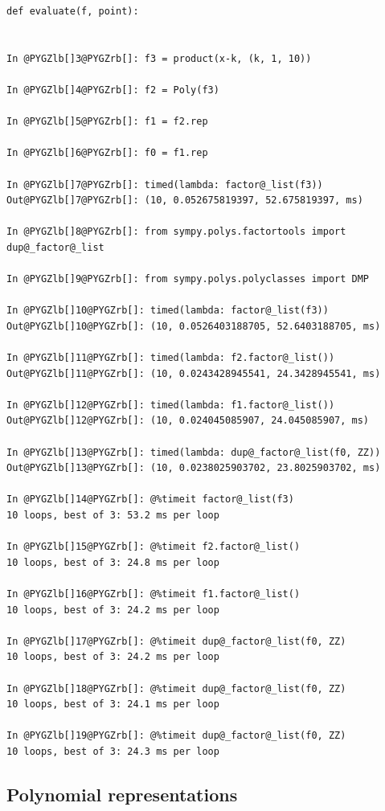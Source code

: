\begin{Verbatim}[commandchars=@\[\]]
def evaluate(f, point):


In @PYGZlb[]3@PYGZrb[]: f3 = product(x-k, (k, 1, 10))

In @PYGZlb[]4@PYGZrb[]: f2 = Poly(f3)

In @PYGZlb[]5@PYGZrb[]: f1 = f2.rep

In @PYGZlb[]6@PYGZrb[]: f0 = f1.rep

In @PYGZlb[]7@PYGZrb[]: timed(lambda: factor@_list(f3))
Out@PYGZlb[]7@PYGZrb[]: (10, 0.052675819397, 52.675819397, ms)

In @PYGZlb[]8@PYGZrb[]: from sympy.polys.factortools import dup@_factor@_list

In @PYGZlb[]9@PYGZrb[]: from sympy.polys.polyclasses import DMP

In @PYGZlb[]10@PYGZrb[]: timed(lambda: factor@_list(f3))
Out@PYGZlb[]10@PYGZrb[]: (10, 0.0526403188705, 52.6403188705, ms)

In @PYGZlb[]11@PYGZrb[]: timed(lambda: f2.factor@_list())
Out@PYGZlb[]11@PYGZrb[]: (10, 0.0243428945541, 24.3428945541, ms)

In @PYGZlb[]12@PYGZrb[]: timed(lambda: f1.factor@_list())
Out@PYGZlb[]12@PYGZrb[]: (10, 0.024045085907, 24.045085907, ms)

In @PYGZlb[]13@PYGZrb[]: timed(lambda: dup@_factor@_list(f0, ZZ))
Out@PYGZlb[]13@PYGZrb[]: (10, 0.0238025903702, 23.8025903702, ms)

In @PYGZlb[]14@PYGZrb[]: @%timeit factor@_list(f3)
10 loops, best of 3: 53.2 ms per loop

In @PYGZlb[]15@PYGZrb[]: @%timeit f2.factor@_list()
10 loops, best of 3: 24.8 ms per loop

In @PYGZlb[]16@PYGZrb[]: @%timeit f1.factor@_list()
10 loops, best of 3: 24.2 ms per loop

In @PYGZlb[]17@PYGZrb[]: @%timeit dup@_factor@_list(f0, ZZ)
10 loops, best of 3: 24.2 ms per loop

In @PYGZlb[]18@PYGZrb[]: @%timeit dup@_factor@_list(f0, ZZ)
10 loops, best of 3: 24.1 ms per loop

In @PYGZlb[]19@PYGZrb[]: @%timeit dup@_factor@_list(f0, ZZ)
10 loops, best of 3: 24.3 ms per loop
\end{Verbatim}
\noindent

\subsection{Polynomial representations}

